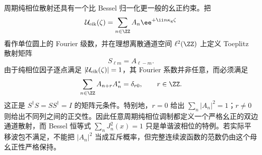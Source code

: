 周期纯相位散射还具有一个比 Bessel 归一化更一般的幺正约束。把
\[
\mathcal U_{\rm eik}(\zeta)
=\sum_{n\in\ZZ}A_n\ee^{+\ii n\kappa_{\rm g}\zeta}
\]
看作单位圆上的 Fourier 级数，并在理想离散通道空间 $\ell^2(\ZZ)$ 上定义 Toeplitz 散射矩阵
\begin{equation}
{
S_{\ell m}=A_{\ell-m}.}
\label{eq:periodic_phase_toeplitz_matrix}
\end{equation}
由于纯相位因子逐点满足 $|\mathcal U_{\rm eik}(\zeta)|=1$，其 Fourier 系数并非任意，而必须满足
\begin{equation}
{
\sum_{n\in\ZZ}A_{n+r}A_n^*=\delta_{r0},
\qquad r\in\ZZ.}
\label{eq:periodic_phase_fourier_unitarity_identity}
\end{equation}
这正是 $S^\dagger S=SS^\dagger=I$ 的矩阵元条件。特别地，$r=0$ 给出
$\sum_n|A_n|^2=1$；$r\neq0$ 则给出不同列之间的正交性。因此任意周期纯相位调制都定义一个严格幺正的双边通道散射，而 Bessel 恒等式
$\sum_nJ_n^2(x)=1$ 只是单谐波相位的特例。若实际平移波包不满足，不能把 $|A_n|^2$ 当成互斥概率，但完整连续波函数的范数仍由这个母幺正性严格保持。

